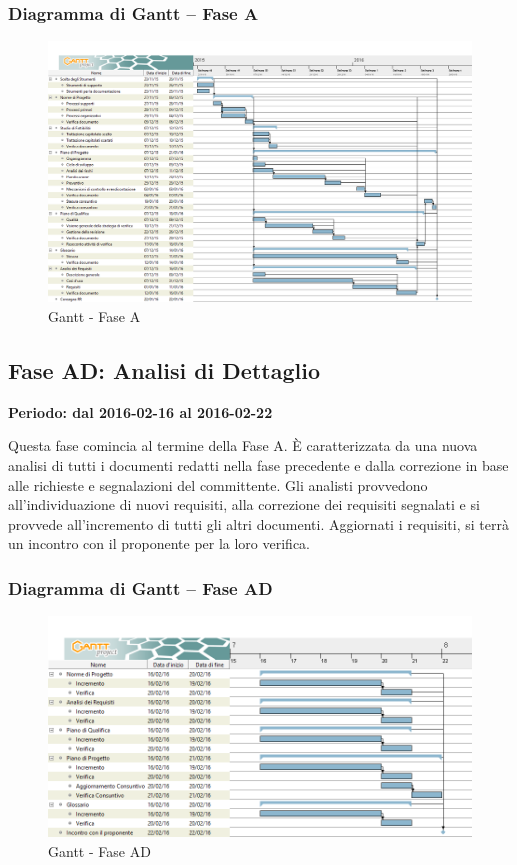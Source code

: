 \documentclass[../PianoProgetto.tex]{subfiles}
\begin{document}
		\subsubsection{Diagramma di Gantt – Fase A}
			\begin{figure}[!h]
				\centering
				\includegraphics[width=\textwidth]{gantt_png/1-analisi}
				\caption{Gantt - Fase A}
				\label{fig:Gantt - Fase A}
			\end{figure}			
	
	\subsection{Fase AD: Analisi di Dettaglio}
		\textbf{Periodo: dal 2016-02-16 al 2016-02-22}

				Questa fase comincia al termine della Fase A. È caratterizzata da una nuova analisi di tutti i documenti redatti nella fase precedente e dalla correzione in base alle richieste e segnalazioni del committente. Gli analisti provvedono all’individuazione di nuovi requisiti, alla correzione dei requisiti segnalati e si provvede all’incremento di tutti gli altri documenti.  Aggiornati i requisiti, si terrà un incontro con il proponente per la loro verifica.
		\newpage			
		\subsubsection{Diagramma di Gantt – Fase AD}
			\begin{figure}[!h]
				\centering
				\includegraphics[width=\textwidth]{gantt_png/2-analisi_di_dettaglio}
				\caption{Gantt - Fase AD}
				\label{fig:Gantt - Fase AD}
			\end{figure}
\end{document}
